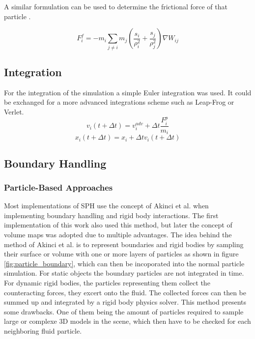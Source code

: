 \documentclass[intern]{cgMA}
\begin{document}
    A similar formulation can be used to determine the frictional force of that particle \cite{10.2312:PE:vriphys:vriphys12:053-060}.

    \begin{equation}
        F_i^f = -m_i \sum_{j \neq i} m_j (\frac{s_i}{\rho_i^2} + \frac{s_j}{\rho_j^2})  \nabla W_{ij}
    \end{equation}

    

    \subsection{Integration}
    For the integration of the simulation a simple Euler integration was used. It could be exchanged for a more advanced integrations scheme such as Leap-Frog or Verlet.
    \begin{equation}
        v_i(t + \Delta t) = v_i^{adv} + \Delta t \frac{F_i^p}{m_i}
    \end{equation}
    \begin{equation}
        x_i(t + \Delta t) = x_i + \Delta t v_i(t + \Delta t)
    \end{equation}

    \subsection{Boundary Handling}
    
    \subsubsection*{Particle-Based Approaches}
    Most implementations of SPH use the concept of Akinci et al. \cite{boundary_handling} when implementing boundary handling and rigid body interactions. The first implementation of this work also used this method, but later the concept of volume maps was adopted due to multiple advantages. The idea behind the method of Akinci et al. \cite{boundary_handling} is to represent boundaries and rigid bodies by sampling their surface or volume with one or more layers of particles as shown in figure \ref{fig:particle_boundary}, which can then be incoporated into the normal particle simulation. For static objects the boundary particles are not integrated in time. For dynamic rigid bodies, the particles representing them collect the counteracting forces, they excert onto the fluid. The collected forces can then be summed up and integrated by a rigid body physics solver.
    This method presents some drawbacks. One of them being the amount of particles required to sample large or complexe 3D models in the scene, which then have to be checked for each neighboring fluid particle. \cite{10.1145/3359566.3360077} \cite{10.2312:PE:vriphys:vriphys12:053-060} \cite{boundary_handling} \cite{10.1145/2185520.2185558}
\end{document}
